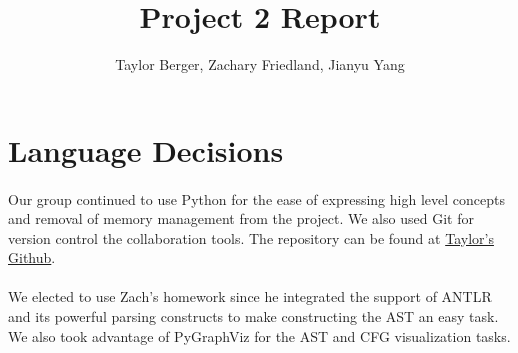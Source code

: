 \documentclass{article}
\begin{document}
\title{Project 2 Report}
\author{Taylor Berger, Zachary Friedland, Jianyu Yang}
\maketitle

\section{Language Decisions}
\paragraph{} Our group continued to use Python for the
ease of expressing high level concepts and removal of memory
management from the project. We also used Git for version control the
collaboration tools. The repository can be found at
\href{https://www.github.com/teberger/cs554-project3}{Taylor's
  Github}.

\paragraph{} We elected to use Zach's homework since he integrated the
support of ANTLR and its powerful parsing constructs to make
constructing the AST an easy task. We also took advantage of PyGraphViz for the AST and CFG visualization tasks. 
\end{document}
